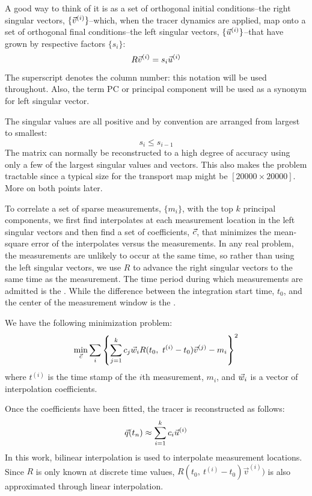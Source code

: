 A good way to think of it is as a set of orthogonal initial conditions--the right singular vectors, $\lbrace \vec v^{(i)} \rbrace$--which, when the tracer dynamics are applied, 
map onto a set of orthogonal final conditions--the left singular vectors, $\lbrace \vec u^{(i)} \rbrace$--that have grown by respective factors $\lbrace s_i \rbrace$:
\begin{equation}
	R \vec v^{(i)} = s_i \vec u^{(i)}
\end{equation}
The superscript denotes the column number: 
this notation will be used throughout.
Also, the term PC or principal component will be used as a synonym for left singular vector.

The singular values are all positive and by convention are arranged from largest to smallest:
\begin{equation}
	s_i \le s_{i-1}
\end{equation}
The matrix can normally be reconstructed to a high degree of accuracy
using only a few of the largest singular values and vectors.
This also makes the problem tractable since a typical size for
the transport map might be $[20000\times20000]$. More on both points later.

To correlate a set of sparse measurements, $\lbrace m_i \rbrace$,
with the top $k$ principal components, we first find interpolates at each
measurement location in the left singular vectors and then find a set
of coefficients, $\vec c$, that minimizes the mean-square error of the
interpolates versus the measurements.
In any real problem, the measurements are unlikely to occur at the same time,
so rather than using the left singular vectors, we use $R$ to advance the
right singular vectors to the same time as the measurement.
The time period during which measurements are admitted is the .
While the difference between the integration start time, $t_0$,
and the center of the measurement window is the .

We have the following minimization problem:
\begin{equation}
\min_{\vec c} \sum_i \left \lbrace \sum_{j=1}^k c_j \vec w_i R(t_0, ~ t^{(i)}-t_0) \vec v^{(j)} - m_i \right \rbrace^2
	\label{PC_proxy_def}
\end{equation}
where $t^{(i)}$ is the time stamp of the $i$th measurement, $m_i$, 
and $\vec w_i$ is a vector of interpolation coefficients.

Once the coefficients have been fitted, the tracer is reconstructed as follows:
\begin{equation}
	\vec q(t_n) \approx \sum_{i=1}^k c_i \vec u^{(i)}
\end{equation}
In this work, bilinear interpolation is used to interpolate measurement
locations. 
Since $R$ is only known at discrete time values, 
$R(t_0, ~t^{(i)}-t_0) \vec v^{(i)})$ 
is also approximated through linear interpolation.

